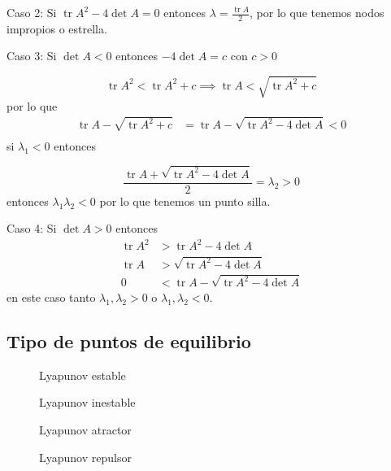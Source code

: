 Caso 2: Si $\operatorname{tr}A^2-4\operatorname{det}A=0$ entonces $\lambda=\frac{\operatorname{tr}A}{2}$, por lo que tenemos nodos impropios o estrella.

Caso 3: Si $\operatorname{det}A<0$ entonces $-4\operatorname{det}A=c$ con $c>0$

 $$
\operatorname{tr}A^2 < \operatorname{tr}A^2 + c \implies \operatorname{tr}A < \sqrt{\operatorname{tr}A^2+c}
$$
por lo que
$$
\begin{aligned}
  \operatorname{tr}A - \sqrt{\operatorname{tr}A^2+c} &= \operatorname{tr}A - \sqrt{\operatorname{tr}A^2 - 4 \operatorname{det}A} <0 \\  
\end{aligned}
$$
si $\lambda_1<0$ entonces

$$
\frac{\operatorname{tr}A + \sqrt{\operatorname{tr}A^2-4\operatorname{det}A}}{2} = \lambda_2 >0
$$
entonces $\lambda_1 \lambda_2 <0$ por lo que tenemos un punto silla.

Caso 4: Si $\operatorname{det}A>0$ entonces $$
\begin{aligned}
  \operatorname{tr}A^2 &> \operatorname{tr}A^2 - 4 \operatorname{det}A \\
  \operatorname{tr}A &> \sqrt{\operatorname{tr}A^2-4\operatorname{det}A} \\
  0&<\operatorname{tr}A - \sqrt{\operatorname{tr}A^2 - 4 \operatorname{det}A}
\end{aligned}
$$
en este caso tanto $\lambda_1,\lambda_2>0$ o $\lambda_1,\lambda_2<0$.

\subsection{Tipo de puntos de equilibrio}

\begin{figure}[ht]
    \centering
    \caption{Lyapunov estable}
    \label{fig:cpe1}
\end{figure}

\begin{figure}[ht]
    \centering
    \caption{Lyapunov inestable}
    \label{fig:cpe2}
\end{figure}

\begin{figure}[ht]
    \centering
    \caption{Lyapunov atractor}
    \label{fig:cp3}
\end{figure}

\begin{figure}[ht]
    \centering
    \caption{Lyapunov repulsor}
    \label{fig:cp4}
\end{figure}

